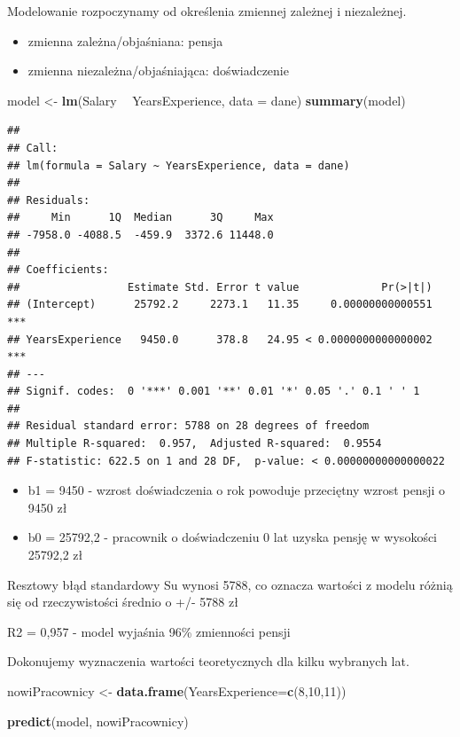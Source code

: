 \documentclass[]{book}
\newenvironment{Shaded}{\begin{snugshade}}{\end{snugshade}}
\newcommand{\DataTypeTok}[1]{\textcolor[rgb]{0.13,0.29,0.53}{#1}}
\newcommand{\DecValTok}[1]{\textcolor[rgb]{0.00,0.00,0.81}{#1}}
\newcommand{\KeywordTok}[1]{\textcolor[rgb]{0.13,0.29,0.53}{\textbf{#1}}}
\newcommand{\NormalTok}[1]{#1}
\newcommand{\OperatorTok}[1]{\textcolor[rgb]{0.81,0.36,0.00}{\textbf{#1}}}
\newcommand{\StringTok}[1]{\textcolor[rgb]{0.31,0.60,0.02}{#1}}
\providecommand{\tightlist}{%
  \setlength{\itemsep}{0pt}\setlength{\parskip}{0pt}}
\begin{document}
Modelowanie rozpoczynamy od określenia zmiennej zależnej i niezależnej.

\begin{itemize}
\tightlist
\item
  zmienna zależna/objaśniana: pensja
\item
  zmienna niezależna/objaśniająca: doświadczenie
\end{itemize}

\begin{Shaded}
\begin{Highlighting}[]
\NormalTok{model <-}\StringTok{ }\KeywordTok{lm}\NormalTok{(Salary }\OperatorTok{~}\StringTok{ }\NormalTok{YearsExperience, }\DataTypeTok{data =}\NormalTok{ dane)}
\KeywordTok{summary}\NormalTok{(model)}
\end{Highlighting}
\end{Shaded}

\begin{verbatim}
## 
## Call:
## lm(formula = Salary ~ YearsExperience, data = dane)
## 
## Residuals:
##     Min      1Q  Median      3Q     Max 
## -7958.0 -4088.5  -459.9  3372.6 11448.0 
## 
## Coefficients:
##                 Estimate Std. Error t value             Pr(>|t|)    
## (Intercept)      25792.2     2273.1   11.35     0.00000000000551 ***
## YearsExperience   9450.0      378.8   24.95 < 0.0000000000000002 ***
## ---
## Signif. codes:  0 '***' 0.001 '**' 0.01 '*' 0.05 '.' 0.1 ' ' 1
## 
## Residual standard error: 5788 on 28 degrees of freedom
## Multiple R-squared:  0.957,  Adjusted R-squared:  0.9554 
## F-statistic: 622.5 on 1 and 28 DF,  p-value: < 0.00000000000000022
\end{verbatim}

\begin{itemize}
\tightlist
\item
  b1 = 9450 - wzrost doświadczenia o rok powoduje przeciętny wzrost pensji o 9450 zł
\item
  b0 = 25792,2 - pracownik o doświadczeniu 0 lat uzyska pensję w wysokości 25792,2 zł
\end{itemize}

Resztowy błąd standardowy Su wynosi 5788, co oznacza wartości z modelu różnią się od rzeczywistości średnio o +/- 5788 zł

R2 = 0,957 - model wyjaśnia 96\% zmienności pensji

Dokonujemy wyznaczenia wartości teoretycznych dla kilku wybranych lat.

\begin{Shaded}
\begin{Highlighting}[]
\NormalTok{nowiPracownicy <-}\StringTok{ }\KeywordTok{data.frame}\NormalTok{(}\DataTypeTok{YearsExperience=}\KeywordTok{c}\NormalTok{(}\DecValTok{8}\NormalTok{,}\DecValTok{10}\NormalTok{,}\DecValTok{11}\NormalTok{))}

\KeywordTok{predict}\NormalTok{(model, nowiPracownicy)}
\end{Highlighting}
\end{Shaded}
\end{document}
